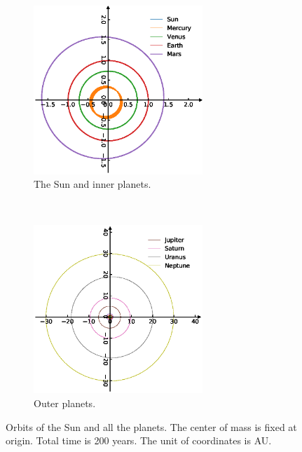 \begin{figure}[bt]
	\begin{subfigure}[tb]{0.5\textwidth}
		\centering
		\includegraphics[width=0.7\textwidth]{solar1.eps}
		\caption{The Sun and inner planets. }
		\label{fig:solarinner}
	\end{subfigure}
	~
	\begin{subfigure}[tb]{0.5\textwidth}
		\centering
		\includegraphics[width=0.7\textwidth]{solar2.eps}
		\caption{Outer planets. }
		\label{fig:solarouter}
	\end{subfigure}
	\caption{Orbits of the Sun and all the planets. The center of mass is fixed at origin. 
		Total time is 200 years. The unit of coordinates is AU. }
	\label{fig:solarsystem}
\end{figure}